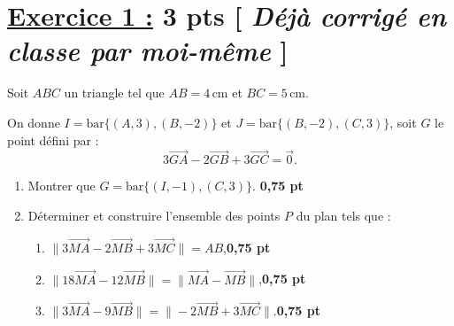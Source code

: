 \documentclass[12pt,a4paper]{article}
\begin{document}
\renewcommand{\arraystretch}{1.5}
\renewcommand{\arrayrulewidth}{1.2pt}
\vspace{3cm}

\section*{\underline{Exercice 1 :} 3 pts [\textit{ Déjà corrigé en classe par moi-même} ]}
Soit \( ABC \) un triangle tel que \( AB = 4\,\text{cm} \) et \( BC = 5\,\text{cm} \).

On donne \( I = \text{bar} \{(A,3), (B,-2)\} \) et \( J = \text{bar} \{(B,-2), (C,3)\} \), soit \( G \) le point défini par :
\[
3\overrightarrow{GA} - 2\overrightarrow{GB} + 3\overrightarrow{GC} = \overrightarrow{0}.
\]

\begin{enumerate}
    \item Montrer que \( G = \text{bar} \{(I,-1), (C,3)\} \). \hfill \textbf{0,75 pt}
    \item Déterminer et construire l'ensemble des points \( P \) du plan tels que :
    \begin{enumerate}
        \item \( \|3\overrightarrow{MA} - 2\overrightarrow{MB} + 3\overrightarrow{MC}\| = AB \),\hfill \textbf{0,75 pt}
        \item \( \|18\overrightarrow{MA} - 12\overrightarrow{MB}\| = \|\overrightarrow{MA} - \overrightarrow{MB}\| \),\hfill \textbf{0,75 pt}
        \item \( \|3\overrightarrow{MA} - 9\overrightarrow{MB}\| = \| -2\overrightarrow{MB} + 3\overrightarrow{MC}\| \).\hfill \textbf{0,75 pt}
    \end{enumerate}
\end{enumerate}
\end{document}
